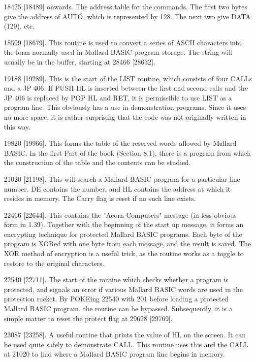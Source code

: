 18425 [18489] onwards. The address table for the commands. The first two bytes 
give the address of AUTO, which is represented by 128. The next two give  DATA 
(129), etc.

18599  [18679]. This routine is used to convert a series of  ASCII  characters 
into the form normally used in Mallard BASIC program storage. The string  will 
usually be in the buffer, starting at 28466 [28632].

19188  [19289]. This is the start of the LIST routine, which consists of  four 
CALLs and a JP 406. If PUSH HL is inserted between the first and second  calls 
and the JP 406 is replaced by POP HL and RET, it is permissible to use LIST as 
a  program line. This obviously has a use in demonstration programs. Since  it 
uses  no more space, it is rather surprising that the code was not  originally 
written in this way.

19820  [19966]. This forms the table of the reserved words allowed by  Mallard 
BASIC.  In the first Part of the book (Section 8.1), there is a  program  from 
which the construction of the table and the contents can be studied.

21020 [21198]. This will search a Mallard BASIC program for a particular  line 
number.  DE  contains  the number, and HL contains the  address  at  which  it 
resides in memory. The Carry flag is reset if no such line exists.

22466  [22644]. This contains the "Acorn Computers" message (in  less  obvious 
form  in 1.39). Together with the beginning of the start up message, it  forms 
an encrypting technique for protected Mallard BASIC programs. Each byte of the 
program is XORed with one byte from each message, and the result is saved. The 
XOR  method of encryption is a useful trick, as the routine works as a  toggle 
to restore to the original characters.

22540  [22711].  The start of the routine which checks whether  a  program  is 
protected, and signals an error if various Mallard BASIC words are used in the 
protection  racket.  By  POKEing 22540 with 201  before  loading  a  protected 
Mallard  BASIC  program, the routine can be bypassed. Subsequently,  it  is  a 
simple matter to reset the protect flag at 29628 [29769].

23087 [23258]. A useful routine that prints the value of HL on the screen.  It 
can  be used quite safely to demonstrate CALL. This routine uses this and  the 
CALL at 21020 to find where a Mallard BASIC program line begins in memory.

